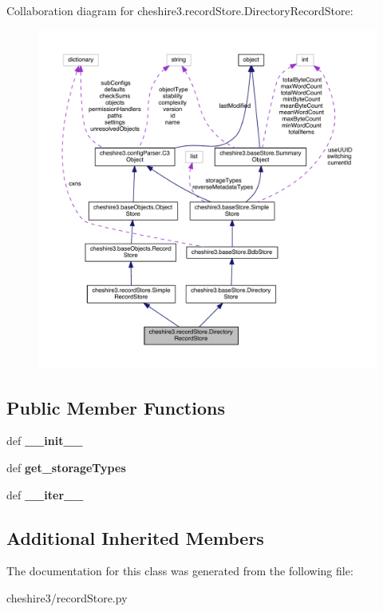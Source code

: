 Collaboration diagram for cheshire3.\-record\-Store.\-Directory\-Record\-Store\-:
\nopagebreak
\begin{figure}[H]
\begin{center}
\leavevmode
\includegraphics[width=350pt]{classcheshire3_1_1record_store_1_1_directory_record_store__coll__graph}
\end{center}
\end{figure}
\subsection*{Public Member Functions}
\begin{DoxyCompactItemize}
\item 
\hypertarget{classcheshire3_1_1record_store_1_1_directory_record_store_a45bd94420dc087fb767778d36088f881}{def {\bfseries \-\_\-\-\_\-init\-\_\-\-\_\-}}\label{classcheshire3_1_1record_store_1_1_directory_record_store_a45bd94420dc087fb767778d36088f881}

\item 
\hypertarget{classcheshire3_1_1record_store_1_1_directory_record_store_ad0971dbff650db789e2d97a798710af3}{def {\bfseries get\-\_\-storage\-Types}}\label{classcheshire3_1_1record_store_1_1_directory_record_store_ad0971dbff650db789e2d97a798710af3}

\item 
\hypertarget{classcheshire3_1_1record_store_1_1_directory_record_store_a6b2ff265ffe041509d39a0a2b4c149c2}{def {\bfseries \-\_\-\-\_\-iter\-\_\-\-\_\-}}\label{classcheshire3_1_1record_store_1_1_directory_record_store_a6b2ff265ffe041509d39a0a2b4c149c2}

\end{DoxyCompactItemize}
\subsection*{Additional Inherited Members}


The documentation for this class was generated from the following file\-:\begin{DoxyCompactItemize}
\item 
cheshire3/record\-Store.\-py\end{DoxyCompactItemize}
